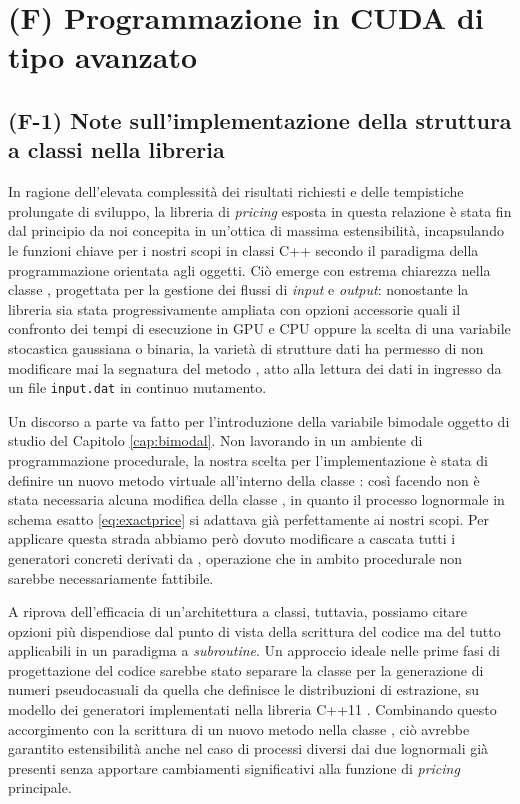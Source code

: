 \chapter{(F) Programmazione in CUDA di tipo avanzato} \label{cap:cudacpp}

\section{(F-1) Note sull'implementazione della struttura a classi nella libreria}
In ragione dell'elevata complessità dei risultati richiesti e delle tempistiche prolungate di sviluppo, la libreria di \textit{pricing} esposta in questa relazione è stata fin dal principio da noi concepita in un'ottica di massima estensibilità, incapsulando le funzioni chiave per i nostri scopi in classi C++ secondo il paradigma della programmazione orientata agli oggetti. Ciò emerge con estrema chiarezza nella classe , progettata per la gestione dei flussi di \textit{input} e \textit{output}: nonostante la libreria sia stata progressivamente ampliata con opzioni accessorie quali il confronto dei tempi di esecuzione in GPU e CPU oppure la scelta di una variabile stocastica gaussiana o binaria, la varietà di strutture dati ha permesso di non modificare mai la segnatura del metodo , atto alla lettura dei dati in ingresso da un file \verb|input.dat| in continuo mutamento.

Un discorso a parte va fatto per l'introduzione della variabile bimodale oggetto di studio del Capitolo \ref{cap:bimodal}. Non lavorando in un ambiente di programmazione procedurale, la nostra scelta per l'implementazione è stata di definire un nuovo metodo virtuale  all'interno della classe : così facendo non è stata necessaria alcuna modifica della classe , in quanto il processo lognormale in schema esatto \eqref{eq:exactprice} si adattava già perfettamente ai nostri scopi. Per applicare questa strada abbiamo però dovuto modificare a cascata tutti i generatori concreti derivati da , operazione che in ambito procedurale non sarebbe necessariamente fattibile.

A riprova dell'efficacia di un'architettura a classi, tuttavia, possiamo citare opzioni più dispendiose dal punto di vista della scrittura del codice ma del tutto applicabili in un paradigma a \textit{subroutine}. Un approccio ideale nelle prime fasi di progettazione del codice sarebbe stato separare la classe per la generazione di numeri pseudocasuali da quella che definisce le distribuzioni di estrazione, su modello dei generatori implementati nella libreria C++11 . Combinando questo accorgimento con la scrittura di un nuovo metodo  nella classe , ciò avrebbe garantito estensibilità anche nel caso di processi diversi dai due lognormali già presenti senza apportare cambiamenti significativi alla funzione di \textit{pricing} principale.

